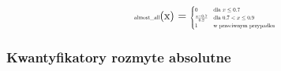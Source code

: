 \documentclass{article}
\begin{document}
\begin{equation*}
\begin{minipage}{0.5\textwidth}
\centering
\text{\scalebox{0.5}{almost\_all}}(x) = \scalebox{0.5}{$
\begin{cases} 
0 & \text{dla } x \leq 0.7 \\
\frac{x - 0.7}{0.2} & \text{dla } 0.7 < x \leq 0.9 \\
1 & \text{w przeciwnym przypadku}
\end{cases}
$}
\end{minipage}
\end{equation*}

\subsubsection{Kwantyfikatory rozmyte absolutne}
\end{document}
